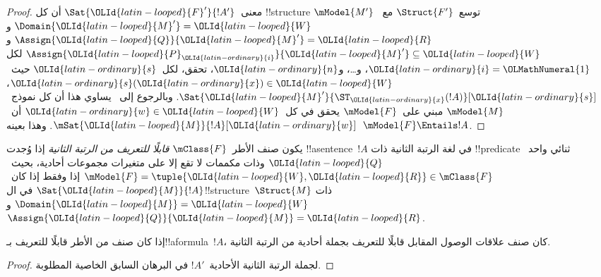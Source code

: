 \documentclass[../../../include/open-logic-section]{subfiles}
\begin{document}
\begin{proof}
  معنى~$\Sat{\OLId{latin-looped}{F}'}{!A'}$ أن كل !!{structure}
  $\mModel{M'}$ توسع~$\Struct{F'}$ مع~$\Domain{\OLId{latin-looped}{M}'} = \OLId{latin-looped}{W}$
  و$\Assign{\OLId{latin-looped}{Q}}{\OLId{latin-looped}{M}'} = \OLId{latin-looped}{R}$ و$\Assign{\OLId{latin-looped}{P}_\OLId{latin-ordinary}{i}}{\OLId{latin-looped}{M}'} \subseteq \OLId{latin-looped}{W}$ لكل
  $\OLId{latin-ordinary}{i} = \OLMathNumeral{1}$، و\dots، و$\OLId{latin-ordinary}{n}$، تحقق، لكل~$\OLId{latin-ordinary}{s}$ حيث~$\OLId{latin-ordinary}{s}(\OLId{latin-ordinary}{x}) \in \OLId{latin-looped}{W}$،
  $\Sat{\OLId{latin-looped}{M}'}{\ST_\OLId{latin-ordinary}{x}(!A)}[\OLId{latin-ordinary}{s}]$. وبالرجوع إلى~
  يساوي هذا أن كل نموذج~$\mModel{M}$ مبني على~$\mModel{F}$
  يحقق في كل~$\OLId{latin-ordinary}{w} \in \OLId{latin-looped}{W}$ أن~$\mSat{\OLId{latin-looped}{M}}{!A}[\OLId{latin-ordinary}{w}]$.
  وهذا بعينه~$\mModel{F} \Entails !A$.
\end{proof}

\begin{defn}
  يكون صنف الأطر~$\mClass{F}$ \emph{قابلًا للتعريف من الرتبة
  الثانية} إذا وُجدت !!a{sentence}~$!A$ في لغة الرتبة الثانية ذات
  !!{predicate} ثنائي واحد~$\OLId{latin-looped}{Q}$ وذات مكممات لا تقع إلا على متغيرات
  مجموعات أحادية، بحيث~$\mModel{F} = \tuple{\OLId{latin-looped}{W}, \OLId{latin-looped}{R}} \in \mClass{F}$
  إذا وفقط إذا كان~$\Sat{\OLId{latin-looped}{M}}{!A}$ في ال!!{structure}~$\Struct{M}$ ذات
  $\Domain{\OLId{latin-looped}{M}} = \OLId{latin-looped}{W}$ و$\Assign{\OLId{latin-looped}{Q}}{\OLId{latin-looped}{M}} = \OLId{latin-looped}{R}$.
\end{defn}

\begin{cor}
  إذا كان صنف من الأطر قابلًا للتعريف بـ!!a{formula}~$!A$، كان صنف
  علاقات الوصول المقابل قابلًا للتعريف بجملة أحادية من الرتبة الثانية.
\end{cor}

\begin{proof}
  لجملة الرتبة الثانية الأحادية~$!A'$ في البرهان السابق الخاصية
  المطلوبة.
\end{proof}
\end{document}
